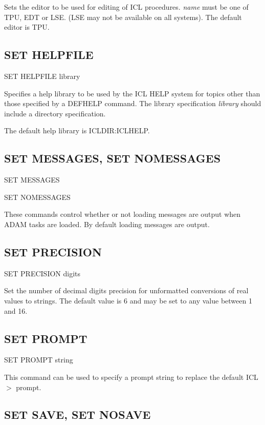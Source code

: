 \documentclass[twoside,11pt,nolof,chapters]{starlink}
\begin{document}
Sets the editor to be used for editing of ICL procedures. \emph{name}
must be one of TPU, EDT or LSE. (LSE may not be available on all systems).
The default editor is TPU.

\subsection{SET HELPFILE\label{SET_HELPFILE}}

   SET HELPFILE library

Specifies a help library to be used by the ICL HELP system for topics other
than those specified by a DEFHELP command. The library specification
\emph{library} should include a directory specification.

The default help library is ICLDIR:ICLHELP.


\subsection{SET MESSAGES, SET NOMESSAGES\label{SET_MESSAGES}}

   SET MESSAGES

   SET NOMESSAGES

These commands control whether or not loading messages are output when
ADAM tasks are loaded. By default loading messages are output.

\subsection{SET PRECISION\label{SET_PRECISION}}

   SET PRECISION \hspace{.5cm} digits

Set the number of decimal digits precision for unformatted conversions
of real values to strings. The default value is 6 and may be set to any
value between 1 and 16.

\subsection{SET PROMPT\label{SET_PROMPT}}

   SET PROMPT \hspace{.5cm} string

This command can be used to specify a prompt string to replace the
default ICL$>$ prompt.

\subsection{SET SAVE, SET NOSAVE\label{SET_SAVE}}
\end{document}
